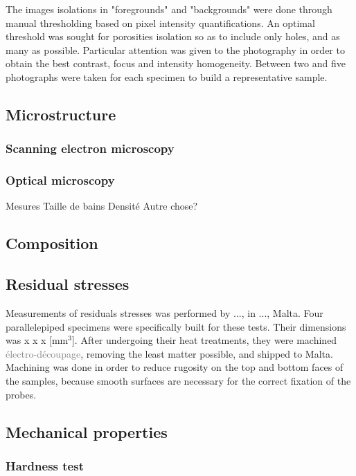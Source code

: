 The images isolations in "foregrounds" and "backgrounds" were done through manual thresholding based on pixel intensity quantifications.  %
An optimal threshold was sought for porosities isolation so as to include only holes, and as many as possible. Particular attention was given to the photography in order to obtain the best contrast, focus and intensity homogeneity. Between two and five photographs were taken for each specimen to build a representative sample.

\subsection{Microstructure}

\subsubsection{Scanning electron microscopy}

\subsubsection{Optical microscopy}
Mesures Taille de bains
Densité
Autre chose?
\subsection{Composition}

\subsection{Residual stresses}

Measurements of residuals stresses was performed by ..., in ..., Malta. Four parallelepiped specimens were specifically built for these tests. Their dimensions was x  x  x [mm$^3$]. After undergoing their heat treatments, they were machined \textcolor{gray}{électro-découpage}, removing the least matter possible, and shipped to Malta. Machining was done in order to reduce rugosity on the top and bottom faces of the samples, because smooth surfaces are necessary for the correct fixation of the probes. \\

\subsection{Mechanical properties}

\subsubsection{Hardness test}

